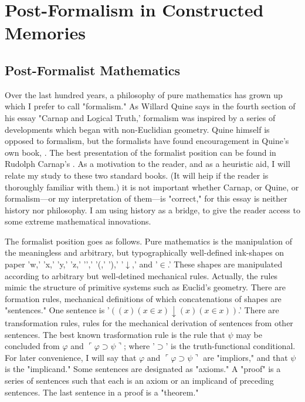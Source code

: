 \documentclass[10pt,twoside,draft]{memoir}
\begin{document}
{\section{Post-Formalism in Constructed Memories}
\subsection{Post-Formalist Mathematics}

Over the last hundred years, a philosophy of pure mathematics has 
grown up which I prefer to call "formalism." As Willard Quine says in the 
fourth section of his essay "Carnap and Logical Truth,' formalism was 
inspired by a series of developments which began with non-Euclidian 
geometry. Quine himself is opposed to formalism, but the formalists have 
found encouragement in Quine's own book, . The best 
presentation of the formalist position can be found in Rudolph Carnap's 
. As a motivation to the reader, and 
as a heuristic aid, I will relate my study to these two standard books. (It will 
heip if the reader is thoroughly familiar with them.) it is not important 
whether Carnap, or Quine, or formalism---or my interpretation of them---is 
"correct," for this essay is neither history nor philosophy. I am using history 
as a bridge, to give the reader access to some extreme mathematical 
innovations. 

The formalist position goes as follows. Pure mathematics is the 
manipulation of the meaningless and arbitrary, but typographically 
well-defined ink-shapes on paper 'w,' 'x,' 'y,' 'z,' '{}',' '(,' '),' '$\downarrow$,' and '$\in$.' 
These shapes are manipulated according to arbitrary but well-detined 
mechanical rules. Actually, the rules mimic the structure of primitive 
systems such as Euclid's geometry. There are formation rules, mechanical 
definitions of which concatenations of shapes are "sentences." One sentence 
is '$((x) (x\in x) \downarrow (x) (x\in x))$.' There are transformation rules, rules for the 
mechanical derivation of sentences from other sentences. The best known 
trasformation rule is the rule that $\psi$ may be concluded from $\varphi$ and 
$\ulcorner \varphi \supset \psi \urcorner$; 
where '$\supset$' is the truth-functional conditional. For later convenience, I will 
say that $\varphi$ and $\ulcorner \varphi \supset \psi \urcorner$ are "impliors," 
and that $\psi$ is the "implicand." 
Some sentences are designated as "axioms." A "proof" is a series of 
sentences such that each is an axiom or an implicand of preceding sentences. 
The last sentence in a proof is a "theorem." 

}
\end{document}
